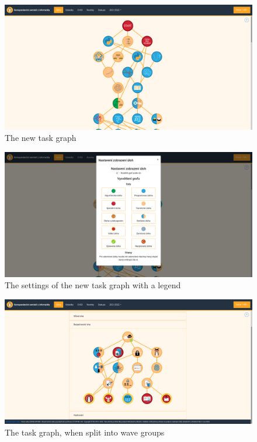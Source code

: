 \documentclass[
  digital, %
  oneside, %
  lof,     %
  nolot,     %
]{fithesis4}
\begin{document}
{\begin{figure}
\includegraphics[width=\textwidth]{assets/img/graph_new}
\caption{The new task graph}
\label{fig:graph-new}
\end{figure}

\begin{figure}
\includegraphics[width=\textwidth]{assets/img/graph_newsettings}
\caption{The settings of the new task graph with a legend}
\label{fig:graph-new-settings}
\end{figure}

\begin{figure}
\includegraphics[width=\textwidth]{assets/img/graph_split}
\caption{The task graph, when split into wave groups}
\label{fig:graph-split}
\end{figure}

}
\end{document}
